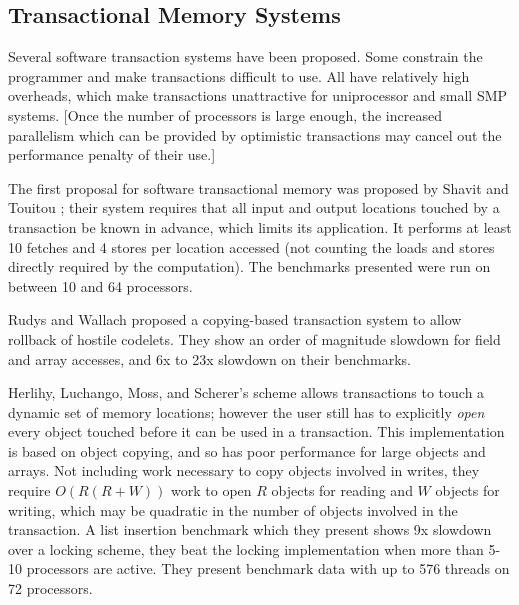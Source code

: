 \documentclass[12pt,twoside]{article}
\newcommand{\subsecput}[2]{\subsection{#2}\label{sec:#1}}
\begin{document}

\subsecput{tm}{Transactional Memory Systems}

Several software transaction systems have been proposed.  Some constrain the
programmer and make transactions difficult to use.  All have
relatively high overheads, which make transactions unattractive for
uniprocessor and small SMP systems. [Once the number of processors is
large enough, the increased parallelism which can be provided by
optimistic transactions may cancel out the performance penalty of
their use.]

The first proposal for software transactional memory was proposed by
Shavit and Touitou \cite{ShavitTo95}; their system requires that all
input and output locations touched by a transaction be known in
advance, which limits its application.  It performs at least 10
fetches and 4 stores per location accessed (not counting the loads and
stores directly required by the computation).  The benchmarks
presented were run on between 10 and 64 processors.

Rudys and Wallach \cite{RudysWa02} proposed a copying-based
transaction system to allow rollback of hostile codelets.
They show an order of magnitude slowdown for field and array
accesses, and 6x to 23x slowdown on their benchmarks.

Herlihy, Luchango, Moss, and Scherer's scheme \cite{HerlihyLuMoSc03}
allows transactions to touch a dynamic set of memory locations;
however the user still has to explicitly \emph{open} every object touched
before it can be used in a transaction.  This implementation is based
on object copying, and so has poor performance for large objects and
arrays.  Not including work necessary to copy objects involved in
writes, they require $O(R(R+W))$ work to open $R$ objects for reading
and $W$ objects for writing, which may be quadratic in the number of objects
involved in the transaction.   A list insertion benchmark which they
present shows 9x slowdown over a locking scheme, they beat the locking
implementation when more than 5-10 processors are active.  They
present benchmark data with up to 576 threads on 72 processors.
\end{document}
